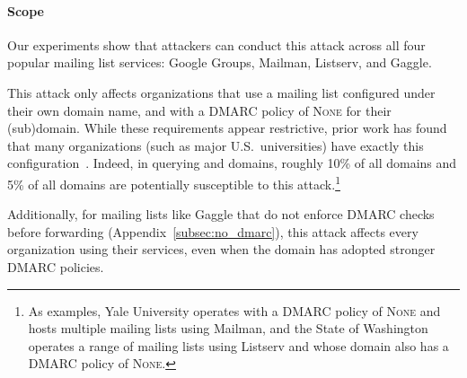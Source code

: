 \paragraph{Scope}
Our experiments show that attackers can
conduct this attack across all four popular mailing list services: Google
Groups, Mailman, Listserv, and Gaggle.

This attack only affects organizations that use a mailing list configured under their own domain name, and with a DMARC policy of \textsc{None} for their (sub)domain.
While these requirements appear restrictive, prior
work has found that many organizations
(such as major U.S.\ universities) have exactly this configuration~\cite{hutowardsunderstanding}.
Indeed, in querying  and
 domains, roughly 10\% of all 
domains and 5\% of all  domains are potentially susceptible to this attack.\footnote{As examples, Yale University operates  with a DMARC policy of \textsc{None} and hosts multiple mailing lists using Mailman, and the State of Washington operates a range of mailing lists using Listserv and whose  domain also has a DMARC policy of \textsc{None}.}

Additionally, for mailing lists like Gaggle that do not enforce DMARC
checks before forwarding (Appendix~\ref{subsec:no_dmarc}), this attack affects every organization using their services,
even when the domain has adopted stronger DMARC policies.

%



